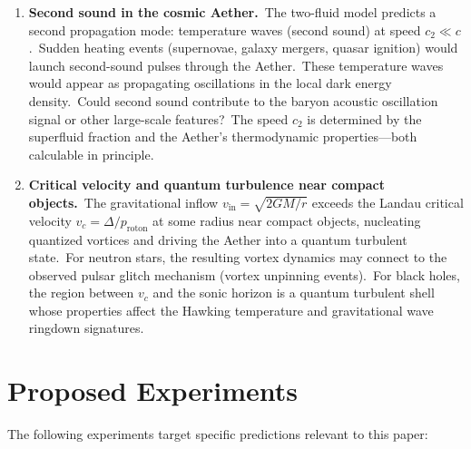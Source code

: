 ﻿\documentclass[12pt,letterpaper]{article}
\newcommand{\vin}{v_{\mathrm{in}}}
\begin{document}
\begin{enumerate}[leftmargin=2em]
  \item \textbf{Second sound in the cosmic Aether.}\ The two-fluid
    model predicts a second propagation mode: temperature waves
    (second sound) at speed $c_2 \ll c$.\ Sudden heating events
    (supernovae, galaxy mergers, quasar ignition) would launch
    second-sound pulses through the Aether.\ These temperature waves
    would appear as propagating oscillations in the local dark energy
    density.\ Could second sound contribute to the baryon acoustic
    oscillation signal or other large-scale features?\ The speed
    $c_2$ is determined by the superfluid fraction and the Aether's
    thermodynamic properties---both calculable in principle.

  \item \textbf{Critical velocity and quantum turbulence near compact
    objects.}\ The gravitational inflow $\vin = \sqrt{2GM/r}$
    exceeds the Landau critical velocity $v_c = \Delta/p_{\mathrm{roton}}$
    at some radius near compact objects, nucleating quantized vortices
    and driving the Aether into a quantum turbulent state.\ For
    neutron stars, the resulting vortex dynamics may connect to the
    observed pulsar glitch mechanism (vortex unpinning events).\ For
    black holes, the region between $v_c$ and the sonic horizon is a
    quantum turbulent shell whose properties affect the Hawking
    temperature and gravitational wave ringdown signatures.

\end{enumerate}



\section{Proposed Experiments}

The following experiments target specific predictions relevant to this paper:
\end{document}
